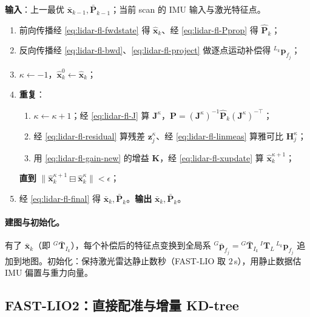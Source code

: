 \begin{algo}\label{alg:lidar-fastlio}
\textbf{输入}：上一最优 $\bar{\mathbf{x}}_{k-1},\bar{\mathbf{P}}_{k-1}$；当前 scan 的 IMU 输入与激光特征点。
\begin{enumerate}
  \item 前向传播经 \cref{eq:lidar-fl-fwdstate} 得 $\hat{\mathbf{x}}_k$、经 \cref{eq:lidar-fl-Pprop} 得 $\hat{\mathbf{P}}_k$；
  \item 反向传播经 \cref{eq:lidar-fl-bwd}、\cref{eq:lidar-fl-project} 做逐点运动补偿得 ${}^{L_k}\mathbf{p}_{f_j}$；
  \item $\kappa\leftarrow-1$，$\hat{\mathbf{x}}^{0}_k\leftarrow\hat{\mathbf{x}}_k$；
  \item \textbf{重复}：
  \begin{enumerate}
    \item $\kappa\leftarrow\kappa+1$；经 \cref{eq:lidar-fl-J} 算 $\mathbf{J}^\kappa$，$\mathbf{P}=(\mathbf{J}^\kappa)^{-1}\hat{\mathbf{P}}_k(\mathbf{J}^\kappa)^{-\top}$；
    \item 经 \cref{eq:lidar-fl-residual} 算残差 $\mathbf{z}^\kappa_j$、经 \cref{eq:lidar-fl-linmeas} 算雅可比 $\mathbf{H}^\kappa_j$；
    \item 用 \cref{eq:lidar-fl-gain-new} 的增益 $\mathbf{K}$，经 \cref{eq:lidar-fl-xupdate} 算 $\hat{\mathbf{x}}^{\kappa+1}_k$；
  \end{enumerate}
  \textbf{直到} $\|\hat{\mathbf{x}}^{\kappa+1}_k\boxminus\hat{\mathbf{x}}^\kappa_k\|<\epsilon$；
  \item 经 \cref{eq:lidar-fl-final} 得 $\bar{\mathbf{x}}_k,\bar{\mathbf{P}}_k$。\textbf{输出} $\bar{\mathbf{x}}_k,\bar{\mathbf{P}}_k$。
\end{enumerate}
\end{algo}

\paragraph{建图与初始化。}
有了 $\bar{\mathbf{x}}_k$（即 ${}^G\bar{\mathbf{T}}_{I_k}$），每个补偿后的特征点变换到全局系 ${}^G\bar{\mathbf{p}}_{f_j}={}^G\bar{\mathbf{T}}_{I_k}\,{}^I\mathbf{T}_L\,{}^{L_k}\mathbf{p}_{f_j}$ 追加到地图。初始化：保持激光雷达静止数秒（FAST-LIO 取 $2$\,s），用静止数据估 IMU 偏置与重力向量。

\subsection{FAST-LIO2：直接配准与增量 KD-tree}
\label{sec:lidar-fastlio2}

